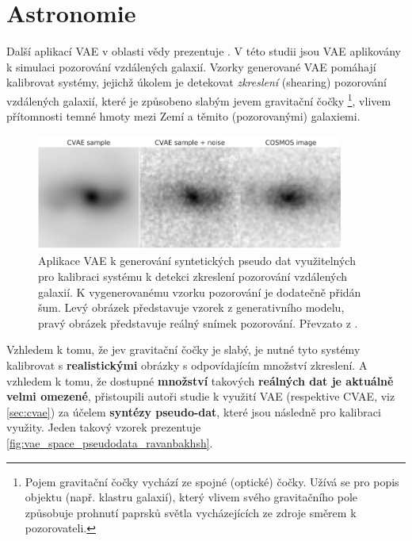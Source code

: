 \section{Astronomie}
\label{sec:applications_astronomy_pseudo_data_synthesis}
Další aplikací VAE v oblasti vědy prezentuje \cite{Ravanbakhsh2016}.
V této studii jsou VAE aplikovány k simulaci pozorování vzdálených galaxií.
Vzorky generované VAE pomáhají kalibrovat systémy, jejichž úkolem je detekovat \emph{zkreslení} (shearing) pozorování vzdálených galaxií, které je způsobeno slabým jevem gravitační čočky
\footnote{Pojem gravitační čočky vychází ze spojné (optické) čočky. Užívá se pro popis objektu (např. klastru galaxií), který vlivem svého gravitačního pole způsobuje prohnutí paprsků světla vycházejících ze zdroje směrem k pozorovateli.},
vlivem přítomnosti temné hmoty mezi Zemí a těmito (pozorovanými) galaxiemi. \cite{Kingma2019}

\begin{figure}[H]
    \centering
    \includegraphics[width=0.9\textwidth]{figures/applications/vae_space_pseudodata_ravanbakhsh.png}
    \caption{Aplikace VAE k generování syntetických pseudo dat využitelných pro kalibraci systému k detekci zkreslení pozorování vzdálených galaxií. K vygenerovanému vzorku pozorování je dodatečně přidán šum. Levý obrázek představuje vzorek z generativního modelu, pravý obrázek představuje reálný snímek pozorování. Převzato z \cite{Ravanbakhsh2016}.}
    \label{fig:vae_space_pseudodata_ravanbakhsh}
\end{figure}


Vzhledem k tomu, že jev gravitační čočky je slabý, je nutné tyto systémy kalibrovat s \textbf{realistickými} obrázky s odpovídajícím množství zkreslení.
A vzhledem k tomu, že dostupné \textbf{množství} takových \textbf{reálných dat je aktuálně velmi omezené}, přistoupili autoři studie k využití VAE (respektive CVAE, viz \autoref{sec:cvae}) za účelem \textbf{syntézy pseudo-dat}, které jsou následně pro kalibraci využity. Jeden takový vzorek prezentuje \autoref{fig:vae_space_pseudodata_ravanbakhsh}.